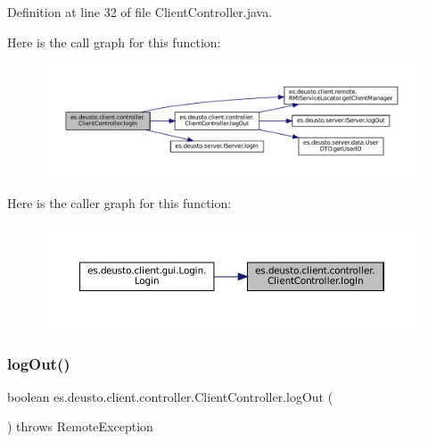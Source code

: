 Definition at line 32 of file Client\+Controller.\+java.

Here is the call graph for this function\+:
\nopagebreak
\begin{figure}[H]
\begin{center}
\leavevmode
\includegraphics[width=350pt]{classes_1_1deusto_1_1client_1_1controller_1_1_client_controller_a075c2e627be920454324dacbbc72295c_cgraph}
\end{center}
\end{figure}
Here is the caller graph for this function\+:
\nopagebreak
\begin{figure}[H]
\begin{center}
\leavevmode
\includegraphics[width=350pt]{classes_1_1deusto_1_1client_1_1controller_1_1_client_controller_a075c2e627be920454324dacbbc72295c_icgraph}
\end{center}
\end{figure}
\mbox{\label{classes_1_1deusto_1_1client_1_1controller_1_1_client_controller_a9379da9c24d71d3ebafaa44e0f858340}} 
\subsubsection{\texorpdfstring{logOut()}{logOut()}}
{\footnotesize\ttfamily boolean es.\+deusto.\+client.\+controller.\+Client\+Controller.\+log\+Out (\begin{DoxyParamCaption}{ }\end{DoxyParamCaption}) throws Remote\+Exception}



